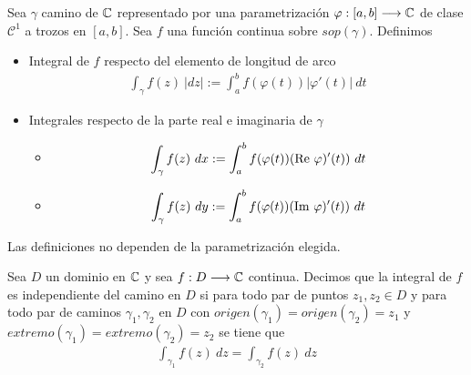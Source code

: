 \begin{defi}
    Sea $\gamma$ camino de $\mathbb{C}$ representado por una parametrización $\varphi : [a,b] \longrightarrow \mathbb{C}$ de clase $\mathcal{C}^1$ a trozos en $[a,b]$. Sea $f$ una función continua sobre $sop(\gamma)$. Definimos
    \begin{itemize}
        \item Integral de $f$ respecto del elemento de longitud de arco
              \begin{align*}
                  \int_{\gamma}{f(z) \ |dz|} := \int_{a}^{b}{f(\varphi(t))|\varphi'(t)| \ dt}
              \end{align*}
        \item Integrales respecto de la parte real e imaginaria de $\gamma$
              \begin{itemize}
                  \item
                        \begin{align*}
                            \int_{\gamma}{f(z) \ dx} := \int_{a}^{b}{f(\varphi(t)) (\text{Re} \ \varphi)'(t)) \ dt}
                        \end{align*}
                  \item
                        \begin{align*}
                            \int_{\gamma}{f(z) \ dy} := \int_{a}^{b}{f(\varphi(t)) (\text{Im} \ \varphi)'(t)) \ dt}
                        \end{align*}
              \end{itemize}
    \end{itemize}
\end{defi}

\begin{obs}
    Las definiciones no dependen de la parametrización elegida.
\end{obs}

\begin{defi}
    Sea $D$ un dominio en $\mathbb{C}$ y sea $f: D \longrightarrow \mathbb{C}$ continua. Decimos que la integral de $f$ es independiente del camino en $D$ si para todo par de puntos $z_1,z_2 \in D$ y para todo par de caminos $\gamma_1,\gamma_2$ en $D$ con $origen(\gamma_1) = origen(\gamma_2) = z_1$ y $extremo(\gamma_1) = extremo(\gamma_2) = z_2$ se tiene que
    \begin{align*}
        \int_{\gamma_1}{f(z) \ dz} = \int_{\gamma_2}{f(z) \ dz}
    \end{align*}
\end{defi}

